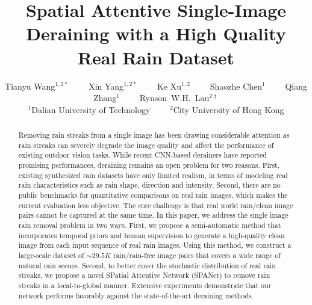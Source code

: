 \documentclass[10pt,twocolumn,letterpaper]{article}
\begin{document}
\title{Spatial Attentive Single-Image Deraining with a High Quality Real Rain Dataset
\vspace{-0.1in}}

\author{Tianyu Wang$^{1,2*}$ \ \ \ \ Xin Yang$^{1,2*}$ \ \ \ \ Ke Xu$^{1,2}$ \ \ \ \ Shaozhe Chen$^{1}$ \ \ \ \ Qiang Zhang$^{1}$ \ \ \ \ Rynson~W.H.~Lau$^{2\dagger}$ \\
$^{1}$Dalian University of Technology \ \ \ \ $^{2}$City University of Hong Kong\\


\vspace{-0.2in}
}







\maketitle
\thispagestyle{empty}

\begin{abstract}
Removing rain streaks from a single image has been drawing considerable attention as rain streaks can severely degrade the image quality and affect the performance of existing outdoor vision tasks.
While recent CNN-based derainers have reported promising performances, deraining remains an open problem for two reasons. First, existing synthesized rain datasets have only limited realism, in terms of modeling real rain characteristics such as rain shape, direction and intensity.
Second, there are no public benchmarks for quantitative comparisons on real rain images, which makes the current evaluation less objective. The core challenge is that real world rain/clean image pairs cannot be captured at the same time.
In this paper, we address the single image rain removal problem in two ways.
First, we propose a semi-automatic method that incorporates temporal priors and human supervision to generate a high-quality clean image from each input sequence of real rain images. Using this method,
we construct a large-scale dataset of $\sim$$29.5K$ rain/rain-free image pairs that covers a wide range of natural rain scenes.
Second, to better cover the stochastic distribution of real rain streaks, we propose a novel SPatial Attentive Network (SPANet) to remove rain streaks in a local-to-global manner.
Extensive experiments demonstrate that our network performs favorably against the state-of-the-art deraining methods.
\vspace{-0.1in}


\end{abstract}
\end{document}
